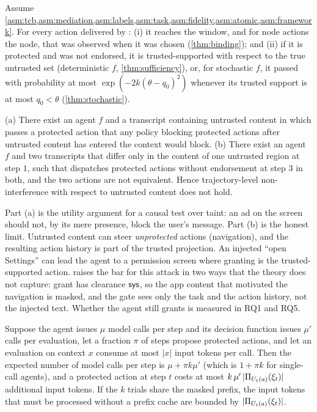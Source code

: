 \begin{theorem}\label{thm:e2e}
Assume \cref{asm:tcb,asm:mediation,asm:labels,asm:task,asm:fidelity,asm:atomic,asm:framework}. For every action delivered by \PG{}: (i) it reaches the window, and for node actions the node, that was observed when it was chosen (\cref{thm:binding}); and (ii) if it is protected and was not endorsed, it is trusted-supported with respect to the true untrusted set (deterministic $f$, \cref{thm:sufficiency}), or, for stochastic $f$, it passed with probability at most $\exp(-2k(\theta-q_0)^2)$ whenever its trusted support is at most $q_0<\theta$ (\cref{thm:stochastic}).
\end{theorem}

\begin{proposition}\label{prop:separation}
(a) There exist an agent $f$ and a transcript containing untrusted content in which \PG{} passes a protected action that any policy blocking protected actions after untrusted content has entered the context would block. (b) There exist an agent $f$ and two transcripts that differ only in the content of one untrusted region at step $1$, such that \PG{} dispatches protected actions without endorsement at step $3$ in both, and the two actions are not equivalent. Hence trajectory-level non-interference with respect to untrusted content does not hold.
\end{proposition}

Part (a) is the utility argument for a causal test over taint: an ad on the screen should not, by its mere presence, block the user's message. Part (b) is the honest limit. Untrusted content can steer \emph{unprotected} actions (navigation), and the resulting action history is part of the trusted projection. An injected ``open Settings'' can lead the agent to a permission screen where granting is the trusted-supported action. \PG{} raises the bar for this attack in two ways that the theory does not capture: \textsf{grant} has clearance $\textsf{sys}$, so the app content that motivated the navigation is masked, and the gate sees only the task and the action history, not the injected text. Whether the agent still grants is measured in RQ1 and RQ5.

\begin{proposition}[Overhead]\label{prop:cost}
Suppose the agent issues $\mu$ model calls per step and its decision function issues $\mu'$ calls per evaluation, let a fraction $\pi$ of steps propose protected actions, and let an evaluation on context $x$ consume at most $|x|$ input tokens per call. Then the expected number of model calls per step is $\mu+\pi k \mu'$ (which is $1+\pi k$ for single-call agents), and a protected action at step $t$ costs at most $k\,\mu'\,|\Pi_{U_t(a)}(\xi_t)|$ additional input tokens. If the $k$ trials share the masked prefix, the input tokens that must be processed without a prefix cache are bounded by $|\Pi_{U_t(a)}(\xi_t)|$.
\end{proposition}

